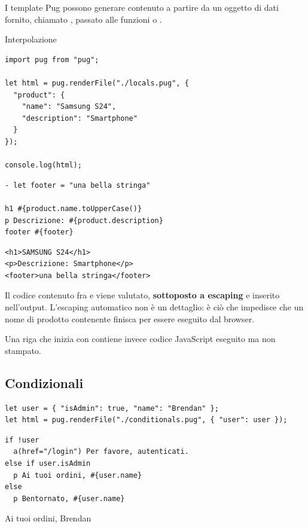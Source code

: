 I template Pug possono generare contenuto a partire da un oggetto di dati
fornito, chiamato , passato alle funzioni  o
.

\begin{esempio}{Interpolazione}
\begin{lstlisting}[style=js]
import pug from "pug";

let html = pug.renderFile("./locals.pug", {
  "product": {
    "name": "Samsung S24",
    "description": "Smartphone"
  }
});

console.log(html);
\end{lstlisting}

\begin{affianco}[0.55]
\begin{lstlisting}[style=pug, name=locals.pug]
- let footer = "una bella stringa"

h1 #{product.name.toUpperCase()}
p Descrizione: #{product.description}
footer #{footer}
\end{lstlisting}
\risultato
\begin{lstlisting}[style=html, name=output.html]
<h1>SAMSUNG S24</h1>
<p>Descrizione: Smartphone</p>
<footer>una bella stringa</footer>
\end{lstlisting}
\end{affianco}

Il codice contenuto fra \code{\#\{} e \code{\}} viene valutato,
\textbf{sottoposto a escaping} e inserito nell'output. L'escaping automatico
non è un dettaglio: è ciò che impedisce che un nome di prodotto contenente
 finisca per essere eseguito dal browser.

Una riga che inizia con \code{-} contiene invece codice JavaScript eseguito ma
non stampato.
\end{esempio}

\subsection{Condizionali}

\begin{lstlisting}[style=js]
let user = { "isAdmin": true, "name": "Brendan" };
let html = pug.renderFile("./conditionals.pug", { "user": user });
\end{lstlisting}

\begin{affianco}[0.55][c]
\begin{lstlisting}[style=pug, name=conditionals.pug]
if !user
  a(href="/login") Per favore, autenticati.
else if user.isAdmin
  p Ai tuoi ordini, #{user.name}
else
  p Bentornato, #{user.name}
\end{lstlisting}
\risultato
\begin{browser}[con user.isAdmin = true]
  Ai tuoi ordini, Brendan
\end{browser}
\end{affianco}

